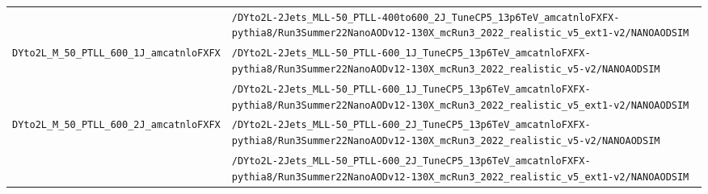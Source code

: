 \begin{longtable}{@{}>{\RaggedRight\arraybackslash}p{} >{\RaggedRight\arraybackslash}p{}@{}}
 & \texttt{/\allowbreak{}DYto2L-\allowbreak{}2Jets\_\allowbreak{}MLL-\allowbreak{}50\_\allowbreak{}PTLL-\allowbreak{}400to600\_\allowbreak{}2J\_\allowbreak{}TuneCP5\_\allowbreak{}13p6TeV\_\allowbreak{}amcatnloFXFX-\allowbreak{}pythia8/\allowbreak{}Run3Summer22NanoAODv12-\allowbreak{}130X\_\allowbreak{}mcRun3\_\allowbreak{}2022\_\allowbreak{}realistic\_\allowbreak{}v5\_\allowbreak{}ext1-\allowbreak{}v2/\allowbreak{}NANOAODSIM} \\
\addlinespace[2pt]
\texttt{DYto2L\_\allowbreak{}M\_\allowbreak{}50\_\allowbreak{}PTLL\_\allowbreak{}600\_\allowbreak{}1J\_\allowbreak{}amcatnloFXFX} & \texttt{/\allowbreak{}DYto2L-\allowbreak{}2Jets\_\allowbreak{}MLL-\allowbreak{}50\_\allowbreak{}PTLL-\allowbreak{}600\_\allowbreak{}1J\_\allowbreak{}TuneCP5\_\allowbreak{}13p6TeV\_\allowbreak{}amcatnloFXFX-\allowbreak{}pythia8/\allowbreak{}Run3Summer22NanoAODv12-\allowbreak{}130X\_\allowbreak{}mcRun3\_\allowbreak{}2022\_\allowbreak{}realistic\_\allowbreak{}v5-\allowbreak{}v2/\allowbreak{}NANOAODSIM} \\
 & \texttt{/\allowbreak{}DYto2L-\allowbreak{}2Jets\_\allowbreak{}MLL-\allowbreak{}50\_\allowbreak{}PTLL-\allowbreak{}600\_\allowbreak{}1J\_\allowbreak{}TuneCP5\_\allowbreak{}13p6TeV\_\allowbreak{}amcatnloFXFX-\allowbreak{}pythia8/\allowbreak{}Run3Summer22NanoAODv12-\allowbreak{}130X\_\allowbreak{}mcRun3\_\allowbreak{}2022\_\allowbreak{}realistic\_\allowbreak{}v5\_\allowbreak{}ext1-\allowbreak{}v2/\allowbreak{}NANOAODSIM} \\
\addlinespace[2pt]
\texttt{DYto2L\_\allowbreak{}M\_\allowbreak{}50\_\allowbreak{}PTLL\_\allowbreak{}600\_\allowbreak{}2J\_\allowbreak{}amcatnloFXFX} & \texttt{/\allowbreak{}DYto2L-\allowbreak{}2Jets\_\allowbreak{}MLL-\allowbreak{}50\_\allowbreak{}PTLL-\allowbreak{}600\_\allowbreak{}2J\_\allowbreak{}TuneCP5\_\allowbreak{}13p6TeV\_\allowbreak{}amcatnloFXFX-\allowbreak{}pythia8/\allowbreak{}Run3Summer22NanoAODv12-\allowbreak{}130X\_\allowbreak{}mcRun3\_\allowbreak{}2022\_\allowbreak{}realistic\_\allowbreak{}v5-\allowbreak{}v2/\allowbreak{}NANOAODSIM} \\
 & \texttt{/\allowbreak{}DYto2L-\allowbreak{}2Jets\_\allowbreak{}MLL-\allowbreak{}50\_\allowbreak{}PTLL-\allowbreak{}600\_\allowbreak{}2J\_\allowbreak{}TuneCP5\_\allowbreak{}13p6TeV\_\allowbreak{}amcatnloFXFX-\allowbreak{}pythia8/\allowbreak{}Run3Summer22NanoAODv12-\allowbreak{}130X\_\allowbreak{}mcRun3\_\allowbreak{}2022\_\allowbreak{}realistic\_\allowbreak{}v5\_\allowbreak{}ext1-\allowbreak{}v2/\allowbreak{}NANOAODSIM} \\

\end{longtable}
